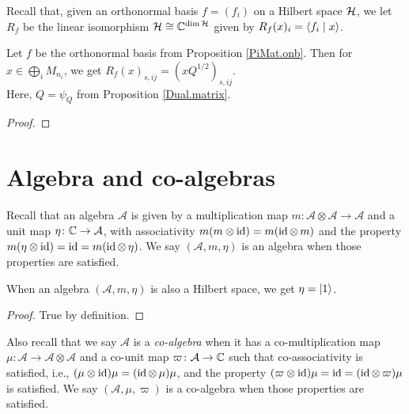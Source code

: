  Recall that, given an orthonormal basis $f=(f_i)$ on a Hilbert space $\mathcal{H}$, we let $R_f$ be the linear isomorphism $\mathcal{H} \cong \mathbb{C}^{\dim\mathcal{H}}$ given by $R_f(x)_i=\left\langle f_i \mid x\right\rangle$.
 \begin{proposition}\label{PiMat.onb_repr}\leanok
  Let $f$ be the orthonormal basis from Proposition \ref{PiMat.onb}.
  Then for $x\in\bigoplus_iM_{n_i}$, we get $R_f(x)_{s,ij}=(xQ^{1/2})_{s,ij}$.\\
  Here, $Q=\psi_Q$ from Proposition \ref{Dual.matrix}.
 \end{proposition}
 \begin{proof}
 \end{proof}

\chapter{Algebra and co-algebras}

 Recall that an algebra $\mathcal{A}$ is given by a multiplication map $m\colon \mathcal{A}\otimes\mathcal{A}\to\mathcal{A}$ and a unit map $\eta\colon \mathbb{C}\to\mathcal{A}$, with associativity $m(m\otimes\operatorname{id})=m(\operatorname{id}\otimes\,m)$ and the property $m(\eta\otimes\operatorname{id})=\operatorname{id}=m(\operatorname{id}\otimes\,\eta)$. We say $(\mathcal{A},m,\eta)$ is an algebra when those properties are satisfied.

 \begin{corollary}\leanok
  When an algebra $(\mathcal{A},m,\eta)$ is also a Hilbert space, we get $\eta=\left\lvert1\right\rangle$.
 \end{corollary}
 \begin{proof}\leanok
  True by definition.
 \end{proof}

 Also recall that we say $\mathcal{A}$ is a \textit{co-algebra} when it has a co-multiplication map $\mu\colon\mathcal{A}\to\mathcal{A}\otimes\mathcal{A}$ and a co-unit map $\varpi\colon\mathcal{A}\to\mathbb{C}$ such that co-associativity is satisfied, i.e., $(\mu\otimes\operatorname{id})\mu=(\operatorname{id}\otimes\,\mu)\mu$, and the property $(\varpi\otimes\operatorname{id})\mu=\operatorname{id}=(\operatorname{id}\otimes\,\varpi)\mu$ is satisfied.
 We say $(\mathcal{A},\mu,\varpi)$ is a co-algebra when those properties are satisfied.

